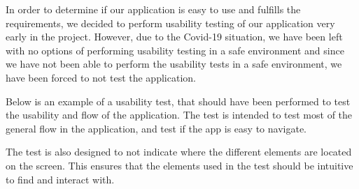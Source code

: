 In order to determine if our application is easy to use and fulfills the requirements, we decided to perform usability testing of our application very early in the project.
However, due to the Covid-19 situation, we have been left with no options of performing usability testing in a safe environment and since we have not been able to perform the usability tests in a safe environment, we have been forced to not test the application.

Below is an example of a usability test, that should have been performed to test the usability and flow of the application. 
The test is intended to test most of the general flow in the application, and test if the app is easy to navigate. 

The test is also designed to not indicate where the different elements are located on the screen.
This ensures that the elements used in the test should be intuitive to find and interact with. 

